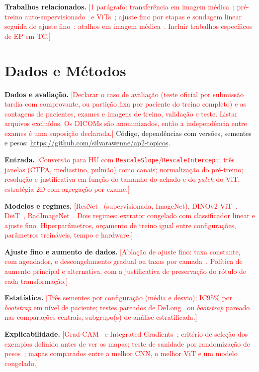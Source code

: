 \documentclass[conference]{IEEEtran}
\newcommand{\pend}[1]{\textcolor{red}{[#1]}}
\begin{document}
\textbf{Trabalhos relacionados.}
\pend{1 parágrafo: transferência em imagem médica~\cite{menegola2017,mei2022}; pré-treino auto-supervisionado~\cite{oquab2024} e ViTs~\cite{touvron2021}; ajuste fino por etapas e sondagem linear seguida de ajuste fino~\cite{howard2018,kumar2022}; atalhos em imagem médica~\cite{zech2018,degrave2021}. Incluir trabalhos específicos de EP em TC.}

\section{Dados e Métodos}
\textbf{Dados e avaliação.}
\pend{Declarar o caso de avaliação (teste oficial por submissão tardia com comprovante, ou partição fixa por paciente do treino completo) e as contagens de pacientes, exames e imagens de treino, validação e teste. Listar arquivos excluídos. Os DICOMs são anonimizados, então a independência entre exames é uma suposição declarada.}
Código, dependências com versões, sementes e pesos: \url{https://github.com/silvarawenne/ap2-topicos}.

\textbf{Entrada.}
\pend{Conversão para HU com \texttt{RescaleSlope}/\texttt{RescaleIntercept}; três janelas (CTPA, mediastino, pulmão) como canais; normalização do pré-treino; resolução e justificativa em função do tamanho do achado e do \textit{patch} do ViT; estratégia 2D com agregação por exame.}

\textbf{Modelos e regimes.}
\pend{ResNet~\cite{he2016} (supervisionada, ImageNet), DINOv2 ViT~\cite{oquab2024}, DeiT~\cite{touvron2021}, RadImageNet~\cite{mei2022}. Dois regimes: extrator congelado com classificador linear e ajuste fino. Hiperparâmetros, orçamento de treino igual entre configurações, parâmetros treináveis, tempo e hardware.}

\textbf{Ajuste fino e aumento de dados.}
\pend{Ablação de ajuste fino: taxa constante, com agendador, e descongelamento gradual ou taxas por camada~\cite{howard2018,kumar2022}. Política de aumento principal e alternativa, com a justificativa de preservação do rótulo de cada transformação.}

\textbf{Estatística.}
\pend{Três sementes por configuração (média e desvio); IC95\% por \textit{bootstrap} em nível de paciente; testes pareados de DeLong~\cite{delong1988} ou \textit{bootstrap} pareado nas comparações centrais; subgrupo(s) de análise estratificada.}

\textbf{Explicabilidade.}
\pend{Grad-CAM~\cite{selvaraju2017} e Integrated Gradients~\cite{sundararajan2017}; critério de seleção dos exemplos definido antes de ver os mapas; teste de sanidade por randomização de pesos~\cite{adebayo2018}; mapas comparados entre a melhor CNN, o melhor ViT e um modelo congelado.}
\end{document}
